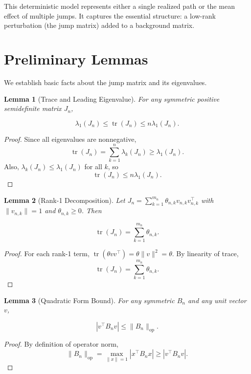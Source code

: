 \documentclass{article}
\newtheorem{lemma}{Lemma}
\begin{document}
This deterministic model represents either a single realized path or the mean effect of multiple jumps. It captures the essential structure: a low-rank perturbation (the jump matrix) added to a background matrix.

\section{Preliminary Lemmas}

We establish basic facts about the jump matrix and its eigenvalues.

\begin{lemma}[Trace and Leading Eigenvalue]
For any symmetric positive semidefinite matrix \(J_n\),

\[
\lambda_1(J_n) \le \operatorname{tr}(J_n) \le n \lambda_1(J_n).
\]

\end{lemma}

\begin{proof}
Since all eigenvalues are nonnegative,
\[
\operatorname{tr}(J_n) = \sum_{k=1}^n \lambda_k(J_n) \ge \lambda_1(J_n).
\]
Also, \(\lambda_k(J_n) \le \lambda_1(J_n)\) for all \(k\), so
\[
\operatorname{tr}(J_n) \le n \lambda_1(J_n).
\]
\end{proof}

\begin{lemma}[Rank-1 Decomposition]
Let \(J_n = \sum_{k=1}^{m_n} \theta_{n,k} v_{n,k} v_{n,k}^\top\) with \(\|v_{n,k}\| = 1\) and \(\theta_{n,k} \ge 0\). Then

\[
\operatorname{tr}(J_n) = \sum_{k=1}^{m_n} \theta_{n,k}.
\]

\end{lemma}

\begin{proof}
For each rank-1 term, \(\operatorname{tr}(\theta v v^\top) = \theta \|v\|^2 = \theta\). By linearity of trace,
\[
\operatorname{tr}(J_n) = \sum_{k=1}^{m_n} \theta_{n,k}.
\]
\end{proof}

\begin{lemma}[Quadratic Form Bound]
For any symmetric \(B_n\) and any unit vector \(v\),

\[
|v^\top B_n v| \le \|B_n\|_{\mathrm{op}}.
\]

\end{lemma}

\begin{proof}
By definition of operator norm,
\[
\|B_n\|_{\mathrm{op}} = \max_{\|x\|=1} |x^\top B_n x| \ge |v^\top B_n v|.
\]
\end{proof}
\end{document}
